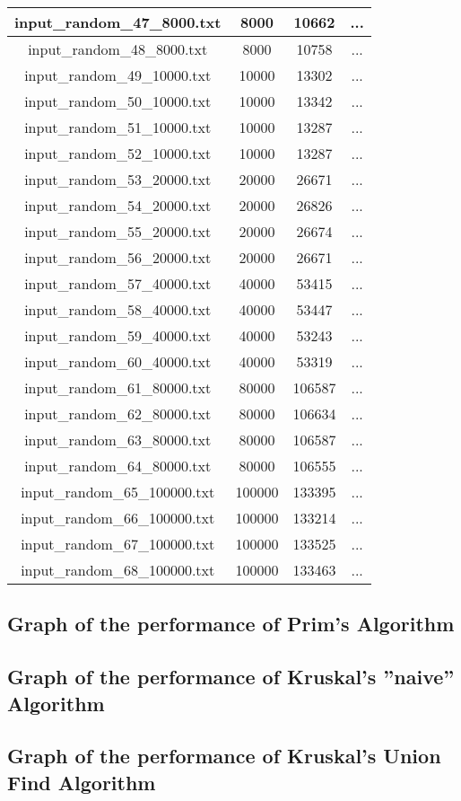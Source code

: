 \begin{longtable}{|c|c|c|c|}
		input\_random\_47\_8000.txt & 8000 & 10662 & ... \\ \hline
		input\_random\_48\_8000.txt & 8000 & 10758 & ... \\ \hline
		input\_random\_49\_10000.txt & 10000 & 13302 & ... \\ \hline
		input\_random\_50\_10000.txt & 10000 & 13342 & ... \\ \hline
		input\_random\_51\_10000.txt & 10000 & 13287 & ... \\ \hline
		input\_random\_52\_10000.txt & 10000 & 13287 & ... \\ \hline
		input\_random\_53\_20000.txt & 20000 & 26671 & ... \\ \hline
		input\_random\_54\_20000.txt & 20000 & 26826 & ... \\ \hline
		input\_random\_55\_20000.txt & 20000 & 26674 & ... \\ \hline
		input\_random\_56\_20000.txt & 20000 & 26671 & ... \\ \hline
		input\_random\_57\_40000.txt & 40000 & 53415 & ... \\ \hline
		input\_random\_58\_40000.txt & 40000 & 53447 & ... \\ \hline
		input\_random\_59\_40000.txt & 40000 & 53243 & ... \\ \hline
		input\_random\_60\_40000.txt & 40000 & 53319 & ... \\ \hline
		input\_random\_61\_80000.txt & 80000 & 106587 & ... \\ \hline
		input\_random\_62\_80000.txt & 80000 & 106634 & ... \\ \hline
		input\_random\_63\_80000.txt & 80000 & 106587 & ... \\ \hline
		input\_random\_64\_80000.txt & 80000 & 106555 & ... \\ \hline
		input\_random\_65\_100000.txt & 100000 & 133395 & ... \\ \hline
		input\_random\_66\_100000.txt & 100000 & 133214 & ... \\ \hline
		input\_random\_67\_100000.txt & 100000 & 133525 & ... \\ \hline
		input\_random\_68\_100000.txt & 100000 & 133463 & ... \\ \hline
	\end{longtable}

\subsection{Graph of the performance of Prim's Algorithm }


\subsection{Graph of the performance of Kruskal's ''naive'' Algorithm}


\subsection{Graph of the performance of Kruskal's Union Find Algorithm}


\pagebreak